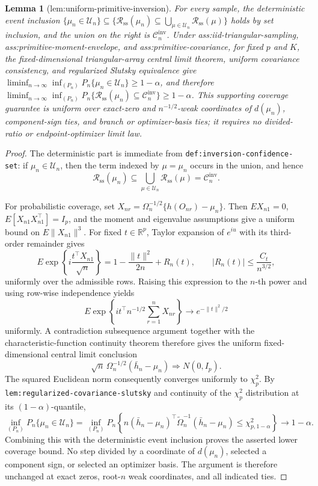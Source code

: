 \documentclass{article}
\newtheorem{lemma}{Lemma}
\begin{document}
\begin{lemma}[lem:uniform-primitive-inversion]\label{lem:uniform-primitive-inversion}
For every sample, the deterministic event inclusion \(\{\mu_n\in\mathcal U_n\}\subseteq\{\mathcal R_{\mathrm{ss}}(\mu_n)\subseteq\bigcup_{\mu\in\mathcal U_n}\mathcal R_{\mathrm{ss}}(\mu)\}\) holds by set inclusion, and the union on the right is \(\mathcal C_n^{\mathrm{inv}}\). Under ass:iid-triangular-sampling, ass:primitive-moment-envelope, and ass:primitive-covariance, for fixed \(p\) and \(K\), the fixed-dimensional triangular-array central limit theorem, uniform covariance consistency, and regularized Slutsky equivalence give \(\liminf_{n\to\infty}\inf_{(P_n)}P_n\{\mu_n\in\mathcal U_n\}\ge1-\alpha\), and therefore \(\liminf_{n\to\infty}\inf_{(P_n)}P_n\{\mathcal R_{\mathrm{ss}}(\mu_n)\subseteq\mathcal C_n^{\mathrm{inv}}\}\ge1-\alpha\). This supporting coverage guarantee is uniform over exact-zero and \(n^{-1/2}\)-weak coordinates of \(d(\mu_n)\), component-sign ties, and branch or optimizer-basis ties; it requires no divided-ratio or endpoint-optimizer limit law.
\end{lemma}
\begin{proof}
The deterministic part is immediate from \texttt{def:inversion-confidence-set}: if \(\mu_n\in\mathcal U_n\), then the term indexed by \(\mu=\mu_n\) occurs in the union, and hence
\[
 \mathcal R_{\mathrm{ss}}(\mu_n)
 \subseteq\bigcup_{\mu\in\mathcal U_n}\mathcal R_{\mathrm{ss}}(\mu)
 =\mathcal C_n^{\mathrm{inv}}.
\]

For probabilistic coverage, set \(X_{nr}=\Omega_n^{-1/2}\{h(O_{nr})-\mu_n\}\).  Then \(E X_{n1}=0\), \(E[X_{n1}X_{n1}^\top]=I_p\), and the moment and eigenvalue assumptions give a uniform bound on \(E\|X_{n1}\|^{3}\).  For fixed \(t\in\mathbb R^p\), Taylor expansion of \(e^{iu}\) with its third-order remainder gives
\[
 E\exp\left\{i\frac{t^\top X_{n1}}{\sqrt n}\right\}
 =1-\frac{\|t\|^2}{2n}+R_n(t),
 \qquad
 |R_n(t)|\le \frac{C_t}{n^{3/2}},
\]
uniformly over the admissible rows.  Raising this expression to the \(n\)-th power and using row-wise independence yields
\[
 E\exp\left\{it^\top n^{-1/2}\sum_{r=1}^nX_{nr}\right\}
 \longrightarrow e^{-\|t\|^2/2}
\]
uniformly.  A contradiction subsequence argument together with the characteristic-function continuity theorem therefore gives the uniform fixed-dimensional central limit conclusion
\[
 \sqrt n\,\Omega_n^{-1/2}(\bar h_n-\mu_n)\Rightarrow N(0,I_p).
\]
The squared Euclidean norm consequently converges uniformly to \(\chi_p^2\).  By \texttt{lem:regularized-covariance-slutsky} and continuity of the \(\chi_p^2\) distribution at its \((1-\alpha)\)-quantile,
\[
 \inf_{(P_n)}P_n\{\mu_n\in\mathcal U_n\}
 =\inf_{(P_n)}P_n\!\left\{
 n(\bar h_n-\mu_n)^\top\widetilde\Omega_n^{-1}(\bar h_n-\mu_n)
 \le\chi^2_{p,1-\alpha}\right\}
 \longrightarrow1-\alpha.
\]
Combining this with the deterministic event inclusion proves the asserted lower coverage bound.  No step divided by a coordinate of \(d(\mu_n)\), selected a component sign, or selected an optimizer basis.  The argument is therefore unchanged at exact zeros, root-\(n\) weak coordinates, and all indicated ties.
\end{proof}
\end{document}
